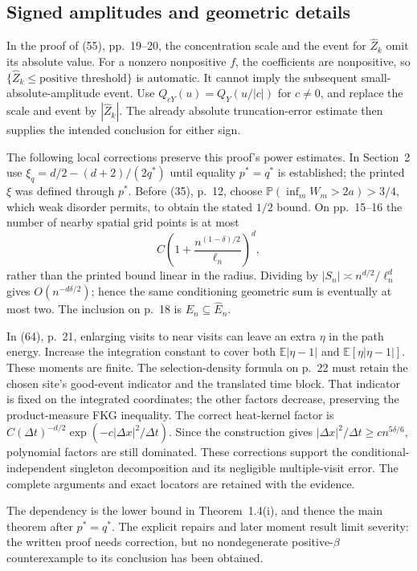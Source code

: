 \documentclass[10pt]{article}
\begin{document}
\subsection*{Signed amplitudes and geometric details}
In the proof of (55), pp. 19–20, the concentration scale and the event for \(\widehat Z_k\) omit its absolute value. For a nonzero nonpositive \(f\), the coefficients are nonpositive, so \(\{\widehat Z_k\leq\text{positive threshold}\}\) is automatic. It cannot imply the subsequent small-absolute-amplitude event. Use \(Q_{cY}(u)=Q_Y(u/|c|)\) for \(c\ne0\), and replace the scale and event by \(|\widehat Z_k|\). The already absolute truncation-error estimate then supplies the intended conclusion for either sign.\par
The following local corrections preserve this proof’s power estimates. In Section 2 use \(\xi_q=d/2-(d+2)/(2q^*)\) until equality \(p^*=q^*\) is established; the printed \(\xi\) was defined through \(p^*\). Before (35), p. 12, choose \(\mathbb P(\inf_mW_m>2a)>3/4\), which weak disorder permits, to obtain the stated \(1/2\) bound. On pp. 15–16 the number of nearby spatial grid points is at most \[C\left(1+\frac{n^{(1-\delta)/2}}{\ell_n}\right)^d,\] rather than the printed bound linear in the radius. Dividing by \(|S_n|\asymp n^{d/2}/\ell_n^d\) gives \(O(n^{-d\delta/2})\); hence the same conditioning geometric sum is eventually at most two. The inclusion on p. 18 is \(E_n\subseteq\widehat E_n\).\par
In (64), p. 21, enlarging visits to near visits can leave an extra \(\eta\) in the path energy. Increase the integration constant to cover both \(\mathbb E|\eta-1|\) and \(\mathbb E[\eta|\eta-1|]\). These moments are finite. The selection-density formula on p. 22 must retain the chosen site’s good-event indicator and the translated time block. That indicator is fixed on the integrated coordinates; the other factors decrease, preserving the product-measure FKG inequality. The correct heat-kernel factor is \(C(\Delta t)^{-d/2}\exp(-c|\Delta x|^2/\Delta t)\). Since the construction gives \(|\Delta x|^2/\Delta t\geq c n^{5\delta/6}\), polynomial factors are still dominated. These corrections support the conditional-independent singleton decomposition and its negligible multiple-visit error. The complete arguments and exact locators are retained with the evidence.\par
The dependency is the lower bound in Theorem 1.4(i), and thence the main theorem after \(p^*=q^*\). The explicit repairs and later moment result limit severity: the written proof needs correction, but no nondegenerate positive-\(\beta\) counterexample to its conclusion has been obtained.\par
\end{document}
